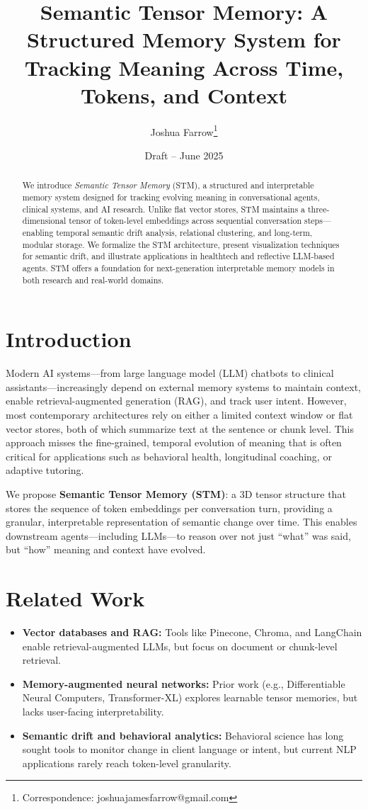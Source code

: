 \documentclass[11pt]{article}
\title{\bf Semantic Tensor Memory: A Structured Memory System for Tracking Meaning Across Time, Tokens, and Context}
\author[1]{Joshua Farrow\thanks{Correspondence: joshuajamesfarrow@gmail.com}}
\affil[1]{Independent Researcher, Richmond, VA, USA}
\date{Draft -- June 2025}
\begin{document}
\maketitle

\begin{abstract}
We introduce \emph{Semantic Tensor Memory} (STM), a structured and interpretable memory system designed for tracking evolving meaning in conversational agents, clinical systems, and AI research. Unlike flat vector stores, STM maintains a three-dimensional tensor of token-level embeddings across sequential conversation steps---enabling temporal semantic drift analysis, relational clustering, and long-term, modular storage. We formalize the STM architecture, present visualization techniques for semantic drift, and illustrate applications in healthtech and reflective LLM-based agents. STM offers a foundation for next-generation interpretable memory models in both research and real-world domains.
\end{abstract}

\section{Introduction}
Modern AI systems---from large language model (LLM) chatbots to clinical assistants---increasingly depend on external memory systems to maintain context, enable retrieval-augmented generation (RAG), and track user intent. However, most contemporary architectures rely on either a limited context window or flat vector stores, both of which summarize text at the sentence or chunk level. This approach misses the fine-grained, temporal evolution of meaning that is often critical for applications such as behavioral health, longitudinal coaching, or adaptive tutoring.

We propose \textbf{Semantic Tensor Memory (STM)}: a 3D tensor structure that stores the sequence of token embeddings per conversation turn, providing a granular, interpretable representation of semantic change over time. This enables downstream agents---including LLMs---to reason over not just ``what'' was said, but ``how'' meaning and context have evolved.

\section{Related Work}
\begin{itemize}[leftmargin=2em]
    \item \textbf{Vector databases and RAG:} Tools like Pinecone, Chroma, and LangChain enable retrieval-augmented LLMs, but focus on document or chunk-level retrieval.
    \item \textbf{Memory-augmented neural networks:} Prior work (e.g., Differentiable Neural Computers, Transformer-XL) explores learnable tensor memories, but lacks user-facing interpretability.
    \item \textbf{Semantic drift and behavioral analytics:} Behavioral science has long sought tools to monitor change in client language or intent, but current NLP applications rarely reach token-level granularity.
\end{itemize}
\end{document}
